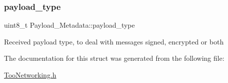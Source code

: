 \subsubsection{\texorpdfstring{payload\+\_\+type}{payload\_type}}
{\footnotesize\ttfamily uint8\+\_\+t Payload\+\_\+\+Metadata\+::payload\+\_\+type}

Received payload type, to deal with messages signed, encrypted or both 

The documentation for this struct was generated from the following file\+:\begin{DoxyCompactItemize}
\item 
\hyperlink{TooNetworking_8h}{Too\+Networking.\+h}\end{DoxyCompactItemize}

